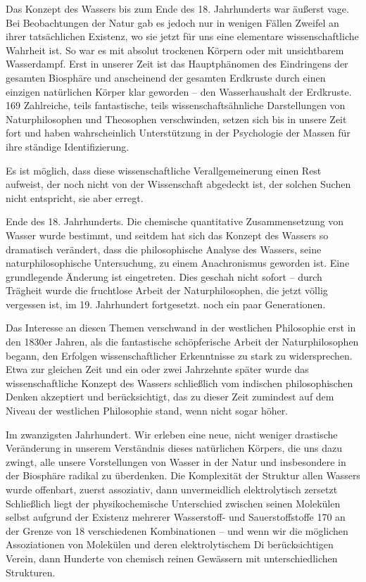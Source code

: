 \documentclass[11pt,a4paper]{book}
\begin{document}
Das Konzept des Wassers bis zum Ende des 18. Jahrhunderts war äußerst vage. Bei Beobachtungen der Natur gab es jedoch nur in wenigen Fällen Zweifel an ihrer tatsächlichen Existenz, wo sie jetzt für uns eine elementare wissenschaftliche Wahrheit ist. So war es mit absolut trockenen Körpern oder mit unsichtbarem Wasserdampf. Erst in unserer Zeit ist das Hauptphänomen des Eindringens der gesamten Biosphäre und anscheinend der gesamten Erdkruste durch einen einzigen natürlichen Körper klar geworden -- den Wasserhaushalt der Erdkruste. 169 Zahlreiche, teils fantastische, teils wissenschaftsähnliche Darstellungen von Naturphilosophen und Theosophen verschwinden, setzen sich bis in unsere Zeit fort und haben wahrscheinlich Unterstützung in der Psychologie der Massen für ihre ständige Identifizierung.



Es ist möglich, dass diese wissenschaftliche Verallgemeinerung einen Rest aufweist, der noch nicht von der Wissenschaft abgedeckt ist, der solchen Suchen nicht entspricht, sie aber erregt.



Ende des 18. Jahrhunderts. Die chemische quantitative Zusammensetzung von Wasser wurde bestimmt, und seitdem hat sich das Konzept des Wassers so dramatisch verändert, dass die philosophische Analyse des Wassers, seine naturphilosophische Untersuchung, zu einem Anachronismus geworden ist. Eine grundlegende Änderung ist eingetreten. Dies geschah nicht sofort -- durch Trägheit wurde die fruchtlose Arbeit der Naturphilosophen, die jetzt völlig vergessen ist, im 19. Jahrhundert fortgesetzt. noch ein paar Generationen.



Das Interesse an diesen Themen verschwand in der westlichen Philosophie erst in den 1830er Jahren, als die fantastische schöpferische Arbeit der Naturphilosophen begann, den Erfolgen wissenschaftlicher Erkenntnisse zu stark zu widersprechen. Etwa zur gleichen Zeit und ein oder zwei Jahrzehnte später wurde das wissenschaftliche Konzept des Wassers schließlich vom indischen philosophischen Denken akzeptiert und berücksichtigt, das zu dieser Zeit zumindest auf dem Niveau der westlichen Philosophie stand, wenn nicht sogar höher.



Im zwanzigsten Jahrhundert. Wir erleben eine neue, nicht weniger drastische Veränderung in unserem Verständnis dieses natürlichen Körpers, die uns dazu zwingt, alle unsere Vorstellungen von Wasser in der Natur und insbesondere in der Biosphäre radikal zu überdenken. Die Komplexität der Struktur allen Wassers wurde offenbart, zuerst assoziativ, dann unvermeidlich elektrolytisch zersetzt Schließlich liegt der physikochemische Unterschied zwischen seinen Molekülen selbst aufgrund der Existenz mehrerer Wasserstoff- und Sauerstoffstoffe 170 an der Grenze von 18 verschiedenen Kombinationen -- und wenn wir die möglichen Assoziationen von Molekülen und deren elektrolytischem Di berücksichtigen Verein, dann Hunderte von chemisch reinen Gewässern mit unterschiedlichen Strukturen.
\end{document}
